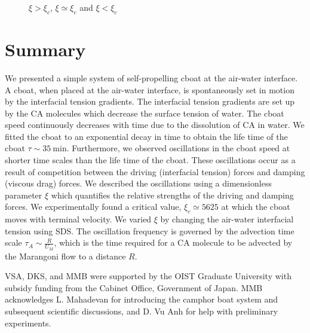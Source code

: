 \documentclass[journal=langd5, manuscript=article, layout=twocolumn]{achemso}
\begin{document}
\begin{figure}[ht]
\begin{minipage}[t]{0.3\linewidth}
	\end{minipage}
	\caption{$\xi > \xi_{c}$, $\xi \simeq \xi_{c}$ and $\xi < \xi_{c}$}\label{fig:uvst_sigma}
\end{figure}
\section{Summary}
\label{sec:summary}
We presented a simple system of self-propelling cboat at the air-water interface. A cboat, when placed at the air-water interface, is spontaneously set in motion by the interfacial tension gradients. The interfacial tension gradients are set up by the CA molecules which decrease the surface tension of water. The cboat speed continuously decreases with time due to the dissolution of CA in water. We fitted the cboat to an exponential decay in time to obtain the life time of the cboat $\tau \sim 35\ \mathrm{min}$. Furthermore, we observed oscillations in the cboat speed at shorter time scales than the life time of the cboat. These oscillations occur as a result of competition between the driving (interfacial tension) forces and damping (viscous drag) forces. We described the oscillations using a dimensionless parameter $\xi$ which quantifies the relative strengths of the driving and damping forces. We experimentally found a critical value, $\xi_{c} \simeq 5625$ at which the cboat moves with terminal velocity. We varied $\xi$ by changing the air-water interfacial tension using SDS. The oscillation frequency is governed by the advection time scale $\tau_{A} \sim \frac{R}{U_{M}}$, which is the time required for a CA molecule to be advected by the Marangoni flow to a distance $R$.

\begin{acknowledgement}
VSA, DKS, and MMB were supported by the OIST Graduate University with subsidy funding from the Cabinet Office, Government of Japan. MMB acknowledges L. Mahadevan for introducing the camphor boat system and subsequent scientific discussions, and D. Vu Anh for help with preliminary experiments.
\end{acknowledgement}






\end{document}
